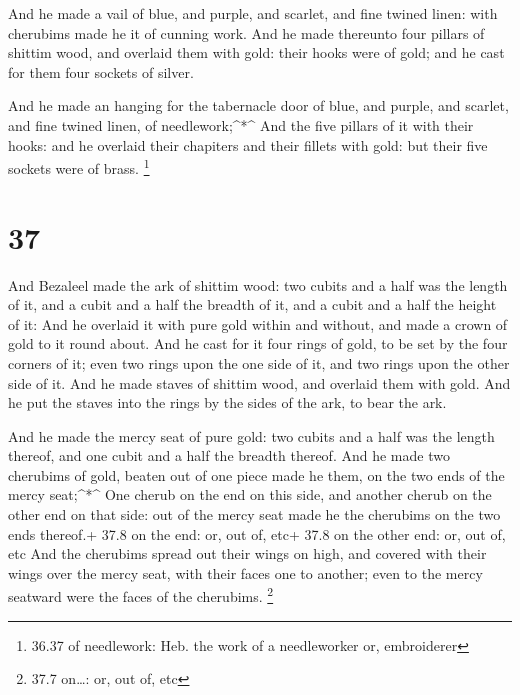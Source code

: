  And he made a vail of blue, and purple, and scarlet, and
fine twined linen: with cherubims made he it of cunning work.
 And he made thereunto four pillars of shittim wood, and
overlaid them with gold: their hooks were of gold; and he cast for them
four sockets of silver.

 And he made an hanging for the tabernacle door of blue,
and purple, and scarlet, and fine twined linen, of needlework;\^{}*\^{}
 And the five pillars of it with their hooks: and he
overlaid their chapiters and their fillets with gold: but their five
sockets were of brass. \footnote{36.37 of needlework: Heb. the work of a
  needleworker or, embroiderer}

\hypertarget{section-36}{%
\section{37}\label{section-36}}

 And Bezaleel made the ark of shittim wood: two cubits and a
half was the length of it, and a cubit and a half the breadth of it, and
a cubit and a half the height of it:  And he overlaid it
with pure gold within and without, and made a crown of gold to it round
about.  And he cast for it four rings of gold, to be set by
the four corners of it; even two rings upon the one side of it, and two
rings upon the other side of it.  And he made staves of
shittim wood, and overlaid them with gold.  And he put the
staves into the rings by the sides of the ark, to bear the ark.

 And he made the mercy seat of pure gold: two cubits and a
half was the length thereof, and one cubit and a half the breadth
thereof.  And he made two cherubims of gold, beaten out of
one piece made he them, on the two ends of the mercy seat;\^{}*\^{}
 One cherub on the end on this side, and another cherub on
the other end on that side: out of the mercy seat made he the cherubims
on the two ends thereof.+ 37.8 on the end: or, out of, etc+ 37.8 on the
other end: or, out of, etc  And the cherubims spread out
their wings on high, and covered with their wings over the mercy seat,
with their faces one to another; even to the mercy seatward were the
faces of the cherubims. \footnote{37.7 on\ldots: or, out of, etc}

